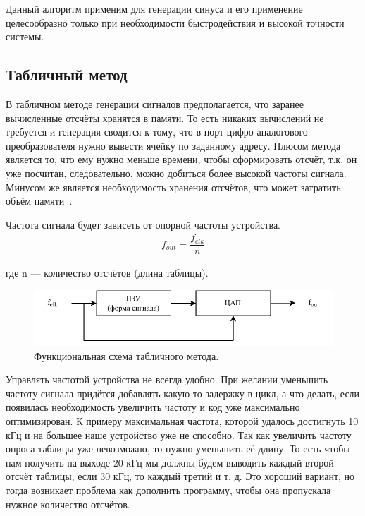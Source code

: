 	Данный алгоритм применим для генерации синуса и его применение целесообразно только при необходимости быстродействия и высокой точности системы.
	
\subsection{Табличный метод}		
	В табличном методе генерации сигналов предполагается, что заранее вычисленные отсчёты хранятся в памяти. То есть никаких вычислений не требуется и генерация сводится к тому, что в порт цифро-аналогового преобразователя нужно вывести ячейку по заданному адресу. 
	Плюсом метода является то, что ему нужно меньше времени, чтобы сформировать отсчёт, т.к. он уже посчитан, следовательно, можно добиться более высокой частоты сигнала. Минусом же является необходимость хранения отсчётов, что может затратить объём памяти~\cite{leso}.
	
	Частота сигнала будет зависеть от опорной частоты устройства.
	\begin{gather}
	f_{out}=\dfrac{f_{clk}}{n}
	\end{gather}	
	
	где n --- количество отсчётов (длина таблицы).	
	
	\begin{figure}[H]
	\centering
    \includegraphics[width=1\textwidth]{../image/table_func.pdf}
    \caption{Функциональная схема табличного метода.}
	\end{figure}
	
	Управлять частотой устройства не всегда удобно. При желании уменьшить частоту сигнала придётся добавлять какую-то задержку в цикл, а что делать, если появилась необходимость увеличить частоту и код уже максимально оптимизирован. К примеру максимальная частота, которой удалось достигнуть 10 кГц и на большее наше устройство уже не способно. Так как увеличить частоту опроса таблицы уже невозможно, то нужно уменьшить её длину. То есть чтобы нам получить на выходе 20 кГц мы должны будем выводить каждый второй отсчёт таблицы, если 30 кГц, то каждый третий и т. д. Это хороший вариант, но тогда возникает проблема как дополнить программу, чтобы она пропускала нужное количество отсчётов.



